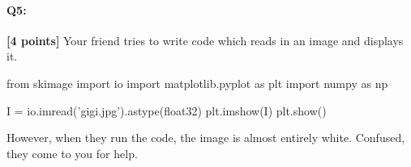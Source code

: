 \documentclass[11pt]{article}
\begin{document}

\pagebreak
    \paragraph{Q5:} \textbf{[4 points]} Your friend tries to write code which reads in an image and displays it. 
    
    \begin{python}
        from skimage import io
        import matplotlib.pyplot as plt
        import numpy as np

        I = io.imread('gigi.jpg').astype(float32)
        plt.imshow(I)
        plt.show()
    \end{python}
    
    However, when they run the code, the image is almost entirely white. Confused, they come to you for help.
\end{document}
